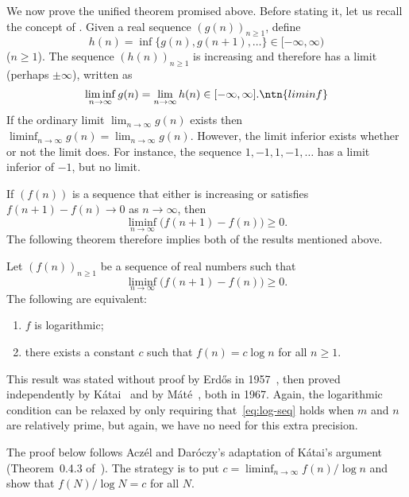 We now prove the unified theorem promised above.  Before stating it, let us
recall the concept of .  Given a real sequence $(g(n))_{n \geq 1}$, define
\[
h(n) = \inf\bigl\{ g(n), g(n + 1), \ldots \bigr\} \in [-\infty, \infty)
\]
($n \geq 1$).  The sequence $(h(n))_{n \geq 1}$ is increasing and therefore
has a limit (perhaps $\pm\infty$), written as
\[
\liminf_{n \to \infty} g(n) = \lim_{n \to \infty} h(n) 
\in [-\infty, \infty].
\ntn{liminf}
\]
If the ordinary limit $\lim_{n \to \infty} g(n)$ exists then $\liminf_{n
  \to \infty} g(n) = \lim_{n \to \infty} g(n)$.  However, the limit
inferior exists whether or not the limit does. For instance, the sequence
$1, -1, 1, -1, \ldots$ has a limit inferior of $-1$, but no limit.

If $(f(n))$ is a sequence that either is increasing or
satisfies $f(n + 1) - f(n) \to 0$ as $n \to \infty$, then
\[
\liminf_{n \to \infty} \bigl(f(n + 1) - f(n)\bigr) \geq 0.
\]
The following theorem therefore implies both of the results mentioned above.

\begin{thm}
%
% 
%
%
% 
Let $(f(n))_{n \geq 1}$ be a sequence of real numbers such that
\[
\liminf_{n \to \infty} \bigl( f(n + 1) - f(n) \bigr) \geq 0.
\]
The following are equivalent:
% 
\begin{enumerate}
\item 
{}
$f$ is logarithmic;

\item
{}
there exists a constant $c$ such that $f(n) = c \log n$ for all $n \geq 1$.
\end{enumerate}
\end{thm}

This result was stated without proof by Erd\H{o}s in 1957~\cite{ErdoDAA},
then proved independently by K\'atai~\cite{Kata} and by
M\'at\'e~\cite{Mate}, both in 1967.  Again, the logarithmic condition can
be relaxed by only requiring that~\eqref{eq:log-seq} holds when $m$ and $n$
are relatively prime, but again, we have no need for this extra precision.

The proof below follows Acz\'el and Dar\'oczy's adaptation of
K\'atai's argument (Theorem~0.4.3 of~\cite{AcDa}).  The strategy is to put
$c = \liminf_{n \to \infty} f(n)/\log n$ and show that $f(N)/\log N = c$
for all $N$.

